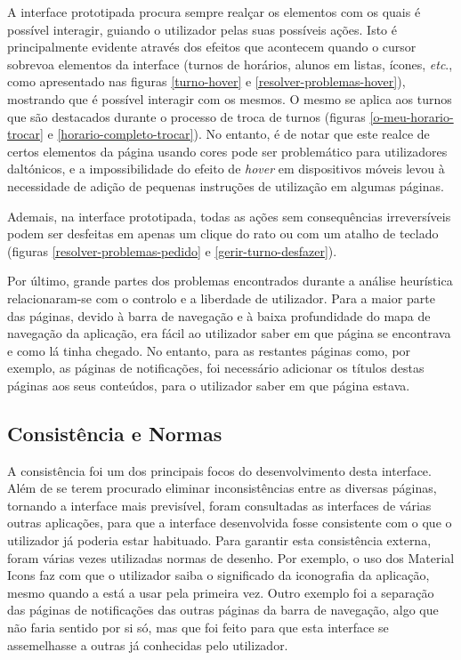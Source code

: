 \documentclass[12pt, a4paper]{article}
\begin{document}
A interface prototipada procura sempre realçar os elementos com os quais é possível interagir,
guiando o utilizador pelas suas possíveis ações. Isto é principalmente evidente através dos
efeitos que acontecem quando o cursor sobrevoa elementos da interface (turnos de horários,
alunos em listas, ícones, \emph{etc}., como apresentado nas figuras \ref{turno-hover} e
\ref{resolver-problemas-hover}), mostrando que é possível interagir com os mesmos. O mesmo se aplica
aos turnos que são destacados durante o processo de troca de turnos (figuras
\ref{o-meu-horario-trocar} e \ref{horario-completo-trocar}). No entanto, é de notar que este realce
de certos elementos da página usando cores pode ser problemático para utilizadores daltónicos, e a
impossibilidade do efeito de \emph{hover} em dispositivos móveis levou à necessidade de adição de
pequenas instruções de utilização em algumas páginas.

Ademais, na interface prototipada, todas as ações sem consequências irreversíveis podem ser
desfeitas em apenas um clique do rato ou com um atalho de teclado (figuras
\ref{resolver-problemas-pedido} e \ref{gerir-turno-desfazer}).

Por último, grande partes dos problemas encontrados durante a análise heurística relacionaram-se com
o controlo e a liberdade de utilizador. Para a maior parte das páginas, devido à barra de navegação
e à baixa profundidade do mapa de navegação da aplicação, era fácil ao utilizador saber em que
página se encontrava e como lá tinha chegado. No entanto, para as restantes páginas como, por
exemplo, as páginas de notificações, foi necessário adicionar os títulos destas páginas aos seus
conteúdos, para o utilizador saber em que página estava.

\subsection{Consistência e Normas}

A consistência foi um dos principais focos do desenvolvimento desta interface. Além de se terem
procurado eliminar inconsistências entre as diversas páginas, tornando a interface mais previsível,
foram consultadas as interfaces de várias outras aplicações, para que a interface desenvolvida
fosse consistente com o que o utilizador já poderia estar habituado. Para garantir esta consistência
externa, foram várias vezes utilizadas normas de desenho. Por exemplo, o uso dos Material Icons
\cite{material-icons} faz com que o utilizador saiba o significado da iconografia da aplicação,
mesmo quando a está a usar pela primeira vez. Outro exemplo foi a separação das páginas de
notificações das outras páginas da barra de navegação, algo que não faria sentido por si só, mas que
foi feito para que esta interface se assemelhasse a outras já conhecidas pelo utilizador.
\end{document}
